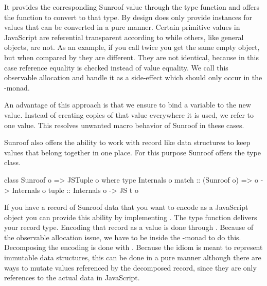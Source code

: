 It provides the corresponding Sunroof value through the type function
  and offers the function 
 to convert to that type. By design  does
only provide instances for values that can be converted in a pure
manner. Certain primitive values in JavaScript are referential 
transparent according to \Src{==} while others, like general objects,
are not. As an example, if you call  twice you get the 
same empty object, but when compared by \Src{==} they are different. They
are not identical, because in this case reference equality is checked
instead of value equality. We call this observable allocation and handle 
it as a side-effect which should only occur in the \JS-monad. 

An advantage of this approach is that we ensure to bind a variable to the 
new value. Instead of creating copies of that value everywhere
it is used, we refer to one value. This resolves 
unwanted macro behavior of Sunroof in these cases.

Sunroof also offers the ability to work with record like data structures to 
keep values that belong together in one place.
For this purpose Sunroof offers the  type class.
\begin{Code}
class Sunroof o => JSTuple o where
  type Internals o
  match :: (Sunroof o) => o -> Internals o
  tuple :: Internals o -> JS t o
\end{Code}
If you have a record of Sunroof data that you want to
encode as a JavaScript object you can provide this ability 
by implementing . The  type function
delivers your record type. Encoding that record as a 
value is done through . 
Because of the observable allocation issue, we have to be 
inside the \JS-monad to do this.
Decomposing the encoding is done with . Because the
 idiom is meant to represent immutable data structures, this 
can be done in a pure manner although there are ways to mutate 
values referenced by the decomposed record, since they are only 
references to the actual data in JavaScript.


